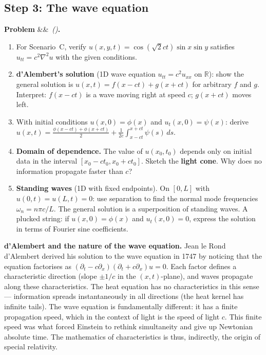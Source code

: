 \documentclass[12pt,a4paper]{article}
\newcounter{problem}
\newenvironment{problem}[1][]{\refstepcounter{problem}\par\vspace{6pt}\noindent\textbf{\color{MidBlue}Problem \theproblem}\ifx&#1&\else\ \textit{(#1)}\fi\textbf{.}\enskip}{\par\vspace{4pt}}
\begin{document}
\subsection{Step 3: The wave equation}

\begin{problem}
\label{prob:wave}
\begin{enumerate}[label=(\alph*),topsep=2pt]
  \item For Scenario~C, verify $u(x,y,t) = \cos(\sqrt{2}ct)\sin x\sin y$ satisfies $u_{tt}=c^2\nabla^2 u$ with the given conditions.
  \item \textbf{d'Alembert's solution} (1D wave equation $u_{tt}=c^2u_{xx}$ on $\mathbb{R}$): show the general solution is $u(x,t) = f(x-ct)+g(x+ct)$ for arbitrary $f$ and $g$. Interpret: $f(x-ct)$ is a wave moving right at speed $c$; $g(x+ct)$ moves left.
  \item With initial conditions $u(x,0)=\phi(x)$ and $u_t(x,0)=\psi(x)$: derive $u(x,t) = \frac{\phi(x-ct)+\phi(x+ct)}{2}+\frac{1}{2c}\int_{x-ct}^{x+ct}\psi(s)\,ds$.
  \item \textbf{Domain of dependence.} The value of $u(x_0,t_0)$ depends only on initial data in the interval $[x_0-ct_0, x_0+ct_0]$. Sketch the \textbf{light cone}. Why does no information propagate faster than $c$?
  \item \textbf{Standing waves} (1D with fixed endpoints). On $[0,L]$ with $u(0,t)=u(L,t)=0$: use separation to find the normal mode frequencies $\omega_n=n\pi c/L$. The general solution is a superposition of standing waves. A plucked string: if $u(x,0)=\phi(x)$ and $u_t(x,0)=0$, express the solution in terms of Fourier sine coefficients.
\end{enumerate}
\end{problem}

\begin{thought}
\textbf{d'Alembert and the nature of the wave equation.}
Jean le Rond d'Alembert derived his solution to the wave equation in 1747 by noticing that the equation factorises as $(\partial_t-c\partial_x)(\partial_t+c\partial_x)u=0$. Each factor defines a characteristic direction (slope $\pm1/c$ in the $(x,t)$-plane), and waves propagate along these characteristics. The heat equation has no characteristics in this sense --- information spreads instantaneously in all directions (the heat kernel has infinite tails). The wave equation is fundamentally different: it has a finite propagation speed, which in the context of light is the speed of light $c$. This finite speed was what forced Einstein to rethink simultaneity and give up Newtonian absolute time. The mathematics of characteristics is thus, indirectly, the origin of special relativity.
\end{thought}
\end{document}
